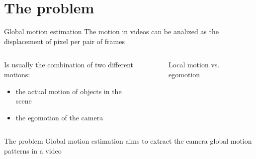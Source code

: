 \documentclass[aspectratio=1610,xcolor=dvipsnames]{beamer}
\begin{document}
\section{The problem}
\begin{frame}{Global motion estimation}
    The motion in videos can be analized as the displacement of pixel per pair of frames
    \bigskip

    \begin{columns}
        \begin{column}{0.45\textwidth}
            Is usually the combination of two different motions:
            \begin{itemize}
                \item the actual motion of objects in the scene
                \item the egomotion of the camera
            \end{itemize}
        \end{column}
        \begin{column}{0.45\textwidth}
            \begin{figure}[H]
                \caption{Local motion vs. egomotion}
            \end{figure}
        \end{column}
    \end{columns}

    \begin{alertblock}{The problem}
        Global motion estimation aims to extract the camera global motion patterns in a video
    \end{alertblock}
\end{frame}
\end{document}
